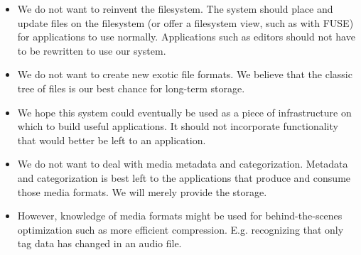 \begin{itemize}

  \item We do not want to reinvent the filesystem. The system should place and
    update files on the filesystem (or offer a filesystem view, such as with
    FUSE) for applications to use normally. Applications such as editors should
    not have to be rewritten to use our system.

  \item We do not want to create new exotic file formats. We believe that the
    classic tree of files is our best chance for long-term storage.

  \item We hope this system could eventually be used as a piece of
    infrastructure on which to build useful applications. It should not
    incorporate functionality that would better be left to an application.

  \item We do not want to deal with media metadata and categorization. Metadata
    and categorization is best left to the applications that produce and consume
    those media formats. We will merely provide the storage.

  \item However, knowledge of media formats might be used for behind-the-scenes
    optimization such as more efficient compression. E.g. recognizing that only
    tag data has changed in an audio file.

\end{itemize}

